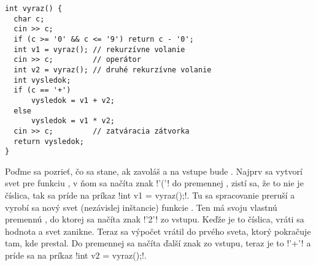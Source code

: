 \begin{lstlisting}[] 
int vyraz() {
  char c;
  cin >> c;
  if (c >= '0' && c <= '9') return c - '0';
  int v1 = vyraz(); // rekurzívne volanie 
  cin >> c;         // operátor
  int v2 = vyraz(); // druhé rekurzívne volanie 
  int vysledok;
  if (c == '+') 
      vysledok = v1 + v2;
  else  
      vysledok = v1 * v2;
  cin >> c;         // zatváracia zátvorka
  return vysledok;
}
\end{lstlisting}

  \def\h{1.6}
  \def\w{3.2}
  \def\vyr#1{\node at (0.5*\w,-\h-0.3) {\vb{#1}};}
  \def\gr{gray!70}
  \def\lcx{0.8}
  \def\lcy{-0.6}

Poďme sa pozrieť, čo sa stane, ak zavoláš  a na vstupe bude . Najprv sa vytvorí svet pre funkciu , v ňom sa načíta znak \prg!'('!
do premennej
, zistí sa, že to nie je číslica, tak sa príde na príkaz \prg!int v1 = vyraz();!. Tu sa spracovanie preruší a vyrobí sa nový svet (nezávislej inštancie) funkcie 
. Ten má svoju vlastnú premennú , do ktorej sa načíta znak \prg!'2'! zo vstupu. Keďže je to číslica, vráti sa hodnota  a svet zanikne.
Teraz sa výpočet vrátil do prvého sveta, ktorý pokračuje tam, kde prestal. Do premennej  sa načíta ďalší znak zo vstupu, teraz je to \prg!'+'!
a príde sa na príkaz \prg!int v2 = vyraz();!.\\ 




